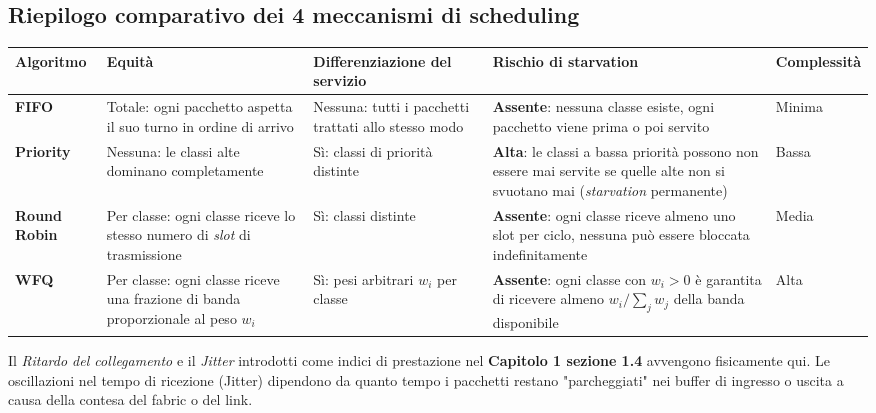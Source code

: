\documentclass[a4paper,12pt]{report}
\renewcommand{\arraystretch}{1.2}
\begin{document}
\subsection{Riepilogo comparativo dei 4 meccanismi di scheduling}
\begin{tcolorbox}[colback=unibolight, colframe=uniboblue,
    title=\bfseries Riepilogo dei meccanismi di scheduling,
    breakable]
\small
\renewcommand{\arraystretch}{1.5}
\begin{tabularx}{\textwidth}{p{2.2cm} X X X X}
\toprule
\textbf{Algoritmo}
    & \textbf{Equità}
    & \textbf{Differenziazione del servizio}
    & \textbf{Rischio di starvation}
    & \textbf{Complessità} \\
\midrule

\textbf{FIFO}
    & Totale: ogni pacchetto aspetta il suo turno in ordine di arrivo
    & Nessuna: tutti i pacchetti trattati allo stesso modo
    & \textcolor{okgreen}{\textbf{Assente}}: nessuna classe esiste, ogni pacchetto viene prima o poi servito
    & Minima \\

\addlinespace[3pt]
\textbf{Priority}
    & Nessuna: le classi alte dominano completamente
    & Sì: classi di priorità distinte
    & \textcolor{alertred}{\textbf{Alta}}: le classi a bassa priorità possono non essere mai servite se quelle alte non si svuotano mai (\textit{starvation} permanente)
    & Bassa \\

\addlinespace[3pt]
\textbf{Round Robin}
    & Per classe: ogni classe riceve lo stesso numero di \textit{slot} di trasmissione
    & Sì: classi distinte
    & \textcolor{okgreen}{\textbf{Assente}}: ogni classe riceve almeno uno slot per ciclo, nessuna può essere bloccata indefinitamente
    & Media \\

\addlinespace[3pt]
\textbf{WFQ}
    & Per classe: ogni classe riceve una frazione di banda proporzionale al peso $w_i$
    & Sì: pesi arbitrari $w_i$ per classe
    & \textcolor{okgreen}{\textbf{Assente}}: ogni classe con $w_i > 0$ è garantita di ricevere almeno $w_i / \sum_j w_j$ della banda disponibile
    & Alta \\

\bottomrule
\end{tabularx}
\end{tcolorbox}
\begin{collegamentobox}[title=�� Collegamento: Ritardo e Jitter]
  Il \textit{Ritardo del collegamento } e il \textit{Jitter} introdotti come indici di prestazione nel \textbf{Capitolo 1 sezione 1.4} avvengono fisicamente qui. 
  Le oscillazioni nel tempo di ricezione (Jitter) dipendono da quanto tempo i pacchetti restano "parcheggiati" nei buffer di ingresso o uscita a causa della contesa del fabric o del link.
\end{collegamentobox}
\end{document}
